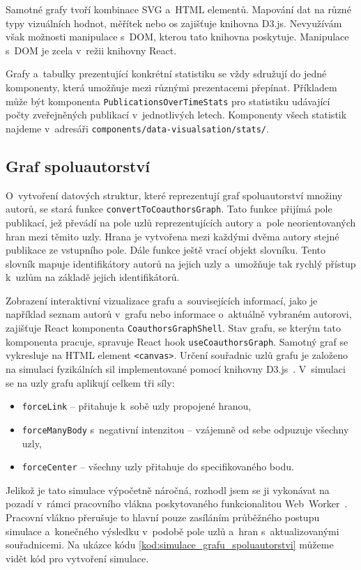 \documentclass[
  biblatex,
  sourcecodes,
  glossaries,
  index
]{kidiplom}
\begin{document}
Samotné grafy tvoří kombinace SVG a~HTML elementů. Mapování dat na různé typy vizuálních hodnot, měřítek nebo os zajišťuje knihovna D3.js. Nevyužívám však možnosti manipulace s~DOM, kterou tato knihovna poskytuje. Manipulace s~DOM je zcela v~režii knihovny React.

Grafy a~tabulky prezentující konkrétní statistiku se vždy sdružují do jedné komponenty, která umožňuje mezi různými prezentacemi přepínat. Příkladem může být komponenta \texttt{PublicationsOverTimeStats} pro statistiku udávající počty zveřejněných publikací v~jednotlivých letech. Komponenty všech statistik najdeme v~adresáři \texttt{components/data-visualsation/stats/}.

\subsection{Graf spoluautorství}

O~vytvoření datových struktur, které reprezentují graf spoluautorství množiny autorů, se stará funkce \texttt{convertToCoauthorsGraph}. Tato funkce přijímá pole publikací, jež převádí na pole uzlů reprezentujících autory a~pole neorientovaných hran mezi těmito uzly. Hrana je vytvořena mezi každými dvěma autory stejné publikace ze vstupního pole. Dále funkce ještě vrací objekt slovníku. Tento slovník mapuje identifikátory autorů na jejich uzly a~umožňuje tak rychlý přístup k~uzlům na základě jejich identifikátorů.

Zobrazení interaktivní vizualizace grafu a~souvisejících informací, jako je například seznam autorů v~grafu nebo informace o~aktuálně vybraném autorovi, zajišťuje React komponenta \texttt{CoauthorsGraphShell}. Stav grafu, se kterým tato komponenta pracuje, spravuje React hook \texttt{useCoauthorsGraph}. Samotný graf se vykresluje na HTML element \texttt{<canvas>}. Určení souřadnic uzlů grafu je založeno na simulaci fyzikálních sil implementované pomocí knihovny D3.js~\cite{t33}. V~simulaci se na uzly grafu aplikují celkem tři síly:
\begin{itemize}
\item \texttt{forceLink} -- přitahuje k~sobě uzly propojené hranou,
\item \texttt{forceManyBody} s~negativní intenzitou -- vzájemně od sebe odpuzuje všechny uzly,
\item \texttt{forceCenter} -- všechny uzly přitahuje do specifikovaného bodu.
\end{itemize}

Jelikož je tato simulace výpočetně náročná, rozhodl jsem se ji vykonávat na pozadí v~rámci pracovního vlákna poskytovaného funkcionalitou Web~Worker~\cite{t34}. Pracovní vlákno přerušuje to hlavní pouze zasíláním průběžného postupu simulace a~konečného výsledku v~podobě pole uzlů a~hran s~aktualizovanými souřadnicemi. Na ukázce kódu \ref{kod:simulace_grafu_spoluautorstvi} můžeme vidět kód pro vytvoření simulace.
\end{document}
